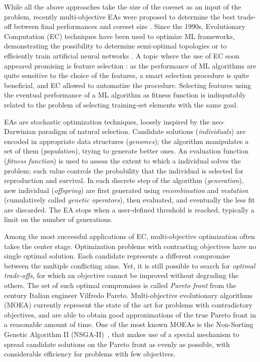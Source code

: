 \documentclass{article}
\begin{document}
While all the above approaches take the size of the coreset as an input of the problem, recently multi-objective EAs were proposed to determine the best trade-off between final performances and coreset size \cite{barbiero2019fundamental,barbiero2019evolutionary}.
Since the 1990s, Evolutionary Computation (EC) techniques have been used to optimize ML frameworks, demonstrating the possibility to determine semi-optimal topologies or to efficiently train artificial neural networks \cite{angeline1994evolutionary,maniezzo1994genetic,frean1990upstart}. A topic where the use of EC soon appeared promising is feature selection \cite{vafaie1992genetic,kim2000feature}: as the performance of ML algorithms are quite sensitive to the choice of the features, a smart selection procedure is quite beneficial, and EC allowed to automatize the procedure. Selecting features using the eventual performance of a ML algorithm as fitness function is indisputably related to the problem of selecting training-set elements with the same goal.

EAs are stochastic optimization techniques, loosely inspired by the neo-Darwinian paradigm of natural selection. Candidate solutions (\emph{individuals}) are encoded in appropriate data structures (\emph{genomes}); the algorithm manipulates a set of them (\emph{population}), trying to generate better ones. An evaluation function (\emph{fitness function}) is used to assess the extent to which a individual solves the problem; such value controls the probability that the individual is selected for reproduction and survival. In each discrete step of the algorithm  (\emph{generation}), new individual (\emph{offspring}) are first generated using \emph{recombination} and \emph{mutation} (cumulatively called \emph{genetic operators}), then evaluated, and eventually the less fit are discarded. The EA stops when a user-defined threshold is reached, typically a limit on the number of generations. 



Among the most successful applications of EC, multi-objective optimization often takes the center stage. Optimization problems with contrasting objectives have no single optimal solution. Each candidate represents a different compromise between the multiple conflicting aims. Yet, it is still possible to search for \emph{optimal trade-offs}, for which an objective cannot be improved without degrading the others. The set of such optimal compromises is called \emph{Pareto front} from the  century Italian engineer Vilfredo Pareto. Multi-objective evolutionary algorithms (MOEA) currently represent the state of the art for problems with contradictory objectives, and are able to obtain good approximations of the true Pareto front in a reasonable amount of time. One of the most known MOEAs is the Non-Sorting Genetic Algorithm II (NSGA-II)~\cite{deb2002fast}, that makes use of a special mechanism to spread candidate solutions on the Pareto front as evenly as possible, with considerable efficiency for problems with few objectives.
\end{document}
